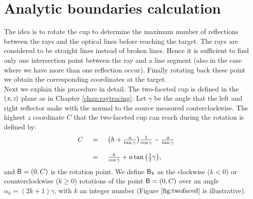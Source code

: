 \section{Analytic boundaries calculation}
The idea is to rotate the cup to determine the maximum number of reflections between the rays and the optical lines before reaching the target. The rays are considered to be straight lines instead of broken lines. Hence it is sufficient to find only one intersection point between the ray and a line segment (also in the case where we have more than one reflection occur). Finally rotating back these point we obtain the corresponding coordinates at the target.\\ \indent
Next we explain this procedure in detail.
The two-faceted cup is defined in the $(\textit{x}, \textit{z})$ plane as in Chapter \ref{chap:raytracing}. 
Let $\gamma$ be the angle that the left and right reflector make with the normal to the source measured conterclockwise. 
The highest $\textit{z}$ coordinate $C$ that the two-faceted cup can reach during the rotation is defined by:
\begin{equation}\label{rotation}\begin{tabular}{llll}
$C$ & $=$ & $ \big(h+\frac{\variabile{a}}{\tan\gamma}\big)\frac{1}{\cos\gamma}-\frac{\variabile{a}}{\tan\gamma}$ \\ $ \quad$ & $ \quad $ & $ \quad $ \\$ \quad$ &  $=$ & $\frac{h}{\cos\gamma}+a\tan\big(\frac{1}{2}\gamma\big),$\end{tabular}
\end{equation} and $\textsf{B}=(0,C)$ is the rotation point. We define $\textsf{B}_k$ as the clockwise ($k<0$) or counterclockwise ($k\geq 0$) rotations of the point $\textsf{B}=(0,C)$ over an angle $\alpha_k=(2k+1)\gamma$, with $k$ an integer number (Figure $\ref{fig:twofaced}$ is illustrative).
